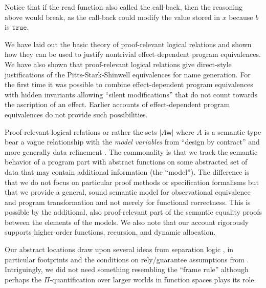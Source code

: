 \documentclass[orivec]{llncs}
\makeatletter
\renewcommand{\section}{\@startsection{section}{1}{\z@}{-10\p@ \@plus -4\p@ \@minus -4\p@}{5\p@ \@plus 4\p@ \@minus 4\p@}{\normalfont\bfseries\boldmath\rightskip=\z@ \@plus 8em\pretolerance=10000 }}
\newcommand{\keywd}[1]{\mathtt{#1}}
\newcommand{\mtrue}{\keywd{true}}
\newcommand\w{\ensuremath{\mathsf{w}}\xspace}
\makeatother
\begin{document}
Notice that if the read function also called the call-back, then the
reasoning above would break, as the call-back could modify the value
stored in $x$ because $b$ is $\mtrue$.



\section{Conclusions}
\label{sec:conclusions}
We have laid out the basic theory of proof-relevant logical relations
and shown how they can be used to justify nontrivial effect-dependent
program equivalences. We have also shown that proof-relevant logical
relations give direct-style justifications of the Pitts-Stark-Shinwell
equivalences for name generation. For the first time it was possible
to combine effect-dependent program equivalences with hidden
invariants allowing ``silent modifications'' that do not count towards
the ascription of an effect.
Earlier accounts of effect-dependent program equivalences
\cite{DBLP:conf/popl/KammarP12,DBLP:conf/ppdp/BentonKBH09,DBLP:conf/ppdp/BentonKBH07,DBLP:conf/aplas/BentonKHB06,DBLP:conf/icfp/ThamsborgB11}
do not provide such possibilities.

Proof-relevant logical relations or rather the sets $|A\w|$ where $A$
is a semantic type bear a vague relationship with the \emph{model
  variables} \cite{DBLP:journals/spe/CheonLSE05} from ``design by
contract'' \cite{DBLP:journals/computer/Meyer92} and more generally
data refinement \cite{DBLP:books/cu/RoeverE1998}. The commonality is
that we track the semantic behavior of a program part with abstract
functions on some abstracted set of data that may contain additional
information (the ``model''). The difference is that we do not focus on
particular proof methods or specification formalisms but that we
provide a general, sound semantic model for observational equivalence
and program transformation and not merely for functional
correctness. This is possible by the additional, also proof-relevant
part of the semantic equality proofs between the elements of the
models. We also note that our account rigorously supports higher-order
functions, recursion, and dynamic allocation. 



Our abstract locations draw upon several ideas from separation logic
\cite{DBLP:conf/lics/Reynolds02}, in particular footprints and the
conditions on rely/guarantee assumptions from
\cite{DBLP:conf/concur/VafeiadisP07}. Intriguingly, we did not need
something resembling the ``frame rule'' although perhaps the
$\Pi$-quantification over larger worlds in function spaces plays its
role.
\end{document}
